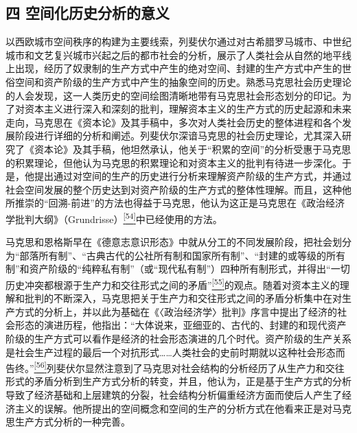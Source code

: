 \documentclass[UTF8, fontset = sourcesans, a4paper, oneside, zihao =
-4, scheme=chinese, no-math, space=true]{ctexbook}
\begin{document}
\subsection{四
空间化历史分析的意义}\label{part0006_split_003.htmlux5cux23c024}

以西欧城市空间秩序的构建为主要线索，列斐伏尔通过对古希腊罗马城市、中世纪城市和文艺复兴城市兴起之后的都市社会的分析，展示了人类社会从自然的地平线上出现，经历了奴隶制的生产方式中产生的绝对空间、封建的生产方式中产生的世俗空间和资产阶级的生产方式中产生的抽象空间的历史。熟悉马克思社会历史理论的人会发现，这一人类历史的空间绘图清晰地带有马克思社会形态划分的印记。为了对资本主义进行深入和深刻的批判，理解资本主义的生产方式的历史起源和未来走向，马克思在《资本论》及其手稿中，多次对人类社会历史的整体进程和各个发展阶段进行详细的分析和阐述。列斐伏尔深谙马克思的社会历史理论，尤其深入研究了《资本论》及其手稿，他坦然承认，他关于``积累的空间''的分析受惠于马克思的积累理论，但他认为马克思的积累理论和对资本主义的批判有待进一步深化。于是，他提出通过对空间的生产的历史进行分析来理解资产阶级的生产方式，并通过社会空间发展的整个历史达到对资产阶级的生产方式的整体性理解。而且，这种他所推崇的``回溯-前进''的方法也得益于马克思，他认为这正是马克思在《政治经济学批判大纲》（Grundrisse）\protect\hypertarget{part0006_split_003.htmlux5cux23w54}{}{}\protect\hyperlink{part0006_split_003.htmlux5cux23m54}{\textsuperscript{{[}54{]}}}中已经使用的方法。

马克思和恩格斯早在《德意志意识形态》中就从分工的不同发展阶段，把社会划分为``部落所有制''、``古典古代的公社所有制和国家所有制''、``封建的或等级的所有制''和资产阶级的``纯粹私有制''（或``现代私有制''）四种所有制形式，并得出``一切历史冲突都根源于生产力和交往形式之间的矛盾''\protect\hypertarget{part0006_split_003.htmlux5cux23w55}{}{}\protect\hyperlink{part0006_split_003.htmlux5cux23m55}{\textsuperscript{{[}55{]}}}的观点。随着对资本主义的理解和批判的不断深入，马克思把关于生产力和交往形式之间的矛盾分析集中在对生产方式的分析上，并以此为基础在《〈政治经济学〉批判》序言中提出了经济的社会形态的演进历程，他指出：``大体说来，亚细亚的、古代的、封建的和现代资产阶级的生产方式可以看作是经济的社会形态演进的几个时代。资产阶级的生产关系是社会生产过程的最后一个对抗形式……人类社会的史前时期就以这种社会形态而告终。''\protect\hypertarget{part0006_split_003.htmlux5cux23w56}{}{}\protect\hyperlink{part0006_split_003.htmlux5cux23m56}{\textsuperscript{{[}56{]}}}列斐伏尔显然注意到了马克思对社会结构的分析经历了从生产力和交往形式的矛盾分析到生产方式分析的转变，并且，他认为，正是基于生产方式的分析导致了经济基础和上层建筑的分裂，社会结构分析偏重经济方面而使后人产生了经济主义的误解。他所提出的空间概念和空间的生产的分析方式在他看来正是对马克思生产方式分析的一种完善。
\end{document}
